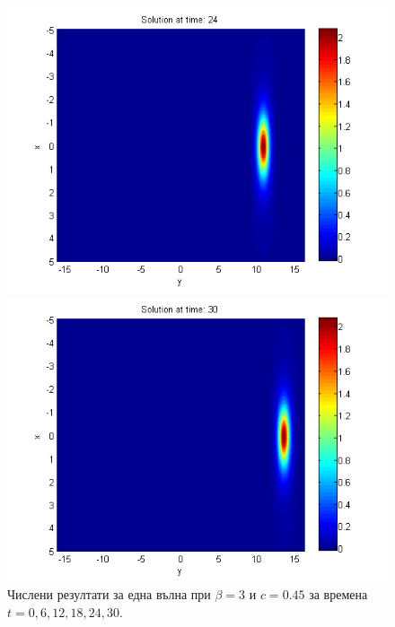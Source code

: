 \documentclass{article}
\begin{document}
\begin{figure}[ht]
\begin{minipage}[b]{0.30\linewidth}
		 \includegraphics[width=\linewidth]{../amitans/figures/solution_30x45_bt3_c045_T24.png}
	\end{minipage}
	\begin{minipage}[b]{0.30\linewidth}
		 \includegraphics[width=\linewidth]{../amitans/figures/solution_30x45_bt3_c045_T30.png}
	\end{minipage}
\caption{Числени резултати за една вълна при $\beta=3$ и $c = 0.45$ за времена $t=0,6,12,18,24,30$.}
\label{Wave1}
\end{figure}
\end{document}
